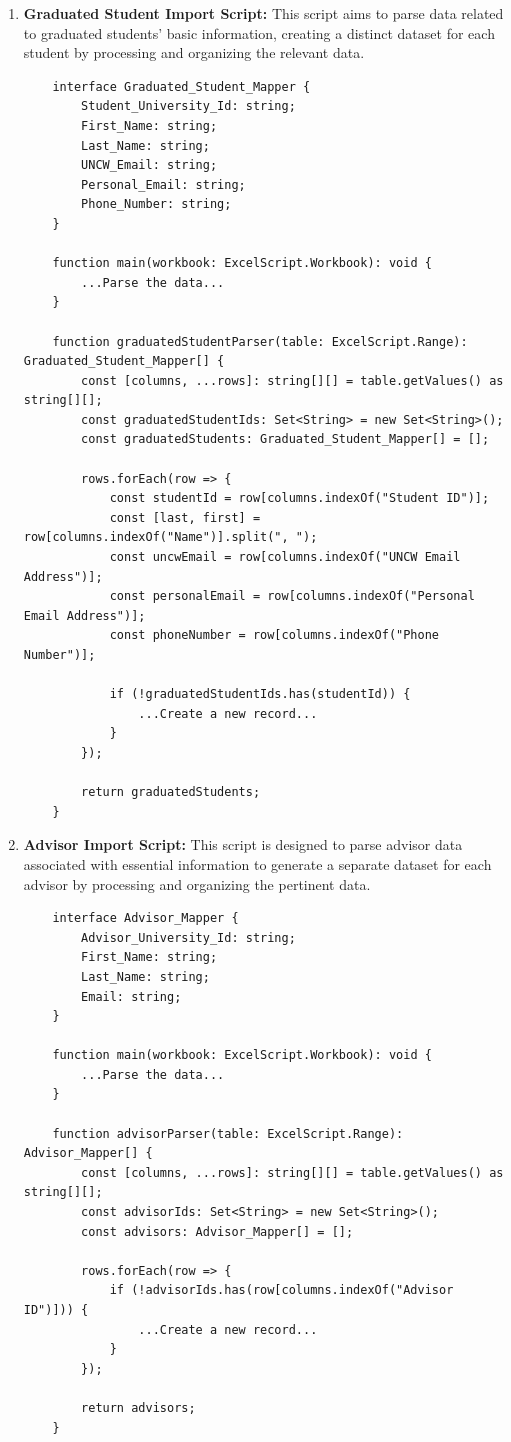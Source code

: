 \documentclass[12pt]{article}
\begin{document}
\begin{enumerate}[label=(\roman*)]
    \item \textbf{Graduated Student Import Script:} This script aims to parse data related to graduated students' basic information, creating a distinct dataset for each student by processing and organizing the relevant data.
    \begin{lstlisting}
    interface Graduated_Student_Mapper {
        Student_University_Id: string;
        First_Name: string;
        Last_Name: string;
        UNCW_Email: string;
        Personal_Email: string;
        Phone_Number: string;
    }
    
    function main(workbook: ExcelScript.Workbook): void {
        ...Parse the data...
    }
    
    function graduatedStudentParser(table: ExcelScript.Range): Graduated_Student_Mapper[] {
        const [columns, ...rows]: string[][] = table.getValues() as string[][];
        const graduatedStudentIds: Set<String> = new Set<String>();
        const graduatedStudents: Graduated_Student_Mapper[] = [];
    
        rows.forEach(row => {
            const studentId = row[columns.indexOf("Student ID")];
            const [last, first] = row[columns.indexOf("Name")].split(", ");
            const uncwEmail = row[columns.indexOf("UNCW Email Address")];
            const personalEmail = row[columns.indexOf("Personal Email Address")];
            const phoneNumber = row[columns.indexOf("Phone Number")];
    
            if (!graduatedStudentIds.has(studentId)) {
                ...Create a new record...
            }
        });
    
        return graduatedStudents;
    }
    \end{lstlisting}

    \item \textbf{Advisor Import Script:} This script is designed to parse advisor data associated with essential information to generate a separate dataset for each advisor by processing and organizing the pertinent data.
    \begin{lstlisting}
    interface Advisor_Mapper {
        Advisor_University_Id: string;
        First_Name: string;
        Last_Name: string;
        Email: string;
    }
    
    function main(workbook: ExcelScript.Workbook): void {
        ...Parse the data...
    }
    
    function advisorParser(table: ExcelScript.Range): Advisor_Mapper[] {
        const [columns, ...rows]: string[][] = table.getValues() as string[][];
        const advisorIds: Set<String> = new Set<String>();
        const advisors: Advisor_Mapper[] = [];
    
        rows.forEach(row => {
            if (!advisorIds.has(row[columns.indexOf("Advisor ID")])) {
                ...Create a new record...
            }
        });
    
        return advisors;
    }
    \end{lstlisting}
\end{enumerate}
\end{document}
